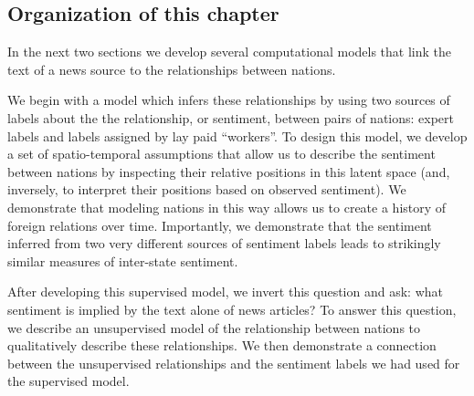 
\subsection*{Organization of this chapter}

In the next two sections we develop several computational models that
link the text of a news source to the relationships between nations.

We begin with a model which infers these relationships by using
two sources of labels about the the relationship, or sentiment,
between pairs of nations: expert labels and labels assigned by lay
paid ``workers''.  To design this model, we develop a set of
spatio-temporal assumptions that allow us to describe the sentiment
between nations by inspecting their relative positions in this
latent space (and, inversely, to interpret their positions based on
observed sentiment).  We demonstrate that modeling nations in
this way allows us to create a history of foreign relations over time.
Importantly, we demonstrate that the sentiment inferred from two
very different sources of sentiment labels leads to strikingly similar
measures of inter-state sentiment.

After developing this supervised model, we invert this question and
ask: what sentiment is implied by the text alone of news articles?  To
answer this question, we describe an unsupervised model of the
relationship between nations to qualitatively describe these
relationships.  We then demonstrate a connection between the
unsupervised relationships and the sentiment labels we had used for
the supervised model.
